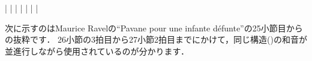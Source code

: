 \documentclass[dvipdfmx,uplatex,b5paper,openany,jbase=12Q,nomag*,textwidth-limit=44%
               ]{gachimuchi}[2020/05/05]
\begin{document}
\begin{Music}
  \generalmeter{\meterC}%
  \Startpiece%
  \NOTEs
  |%
  \en\bar
  \NOTEs
  |%
  \en\bar
  \NOTEs
  |%
  \en\bar
  \NOTEs
  |%
  \en\setdoublebar
  \endpiece\vspace{-.5\baselineskip}%
\end{Music}

次に示すのはMaurice Ravelの``Pavane pour une infante défunte''の25小節目からの抜粋です．
26小節の3拍目から27小節2拍目までにかけて，同じ構造(\txSqr{})の和音が並進行しながら使用されているのが分かります．
\end{document}
